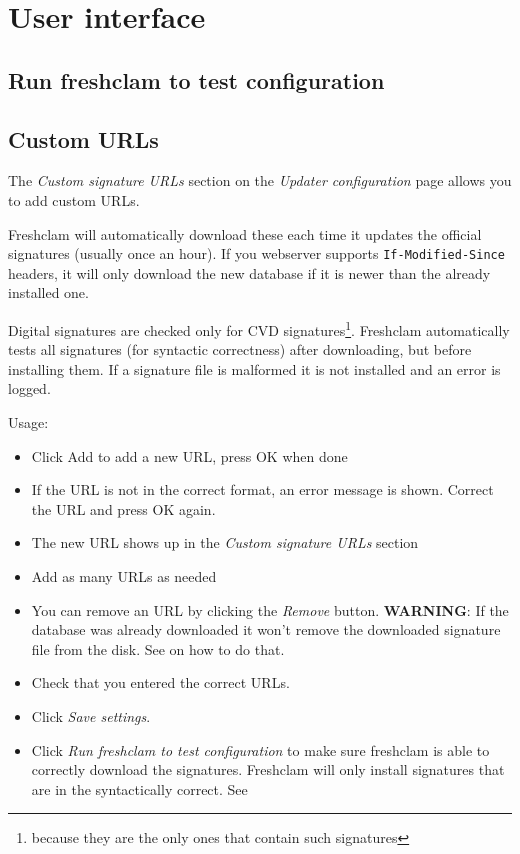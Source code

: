 \chapter{User interface}
\section{Run freshclam to test configuration}
\label{sec:runfreshclam}
\section{Custom URLs}
\label{sec:ui_urladd}
The \emph{Custom signature URLs} section on the \emph{Updater configuration}
page allows you to add custom URLs.

Freshclam will automatically download these each time it updates the official signatures (usually once an hour).
If you webserver supports \verb+If-Modified-Since+ headers, it will only
download the new database if it is newer than the already installed one.

Digital signatures  are checked only for \gls{CVD} signatures\footnote{because they are the only ones that contain such signatures}.
Freshclam automatically tests all signatures (for syntactic correctness) after downloading, but
before installing them. If a signature file is malformed it is not installed and
an error is logged.

Usage:
\begin{itemize}
\item Click Add to add a new URL, press OK when done
\item If the URL is not in the correct format, an error message is shown.
Correct the URL and press OK again.
\item The new URL shows up in the \emph{Custom signature URLs} section
\item Add as many URLs as needed
\item You can remove an URL by clicking the \emph{Remove} button.
\textbf{WARNING}: If the database was already downloaded it won't remove the downloaded signature file from the disk.
See  on how to do that.
\item Check that you entered the correct URLs.
\item Click \emph{Save settings}.
\item Click \emph{Run freshclam to test configuration} to make sure freshclam is
able to correctly download the signatures. Freshclam will only install
signatures that are in the syntactically correct.
See 
\end{itemize}

